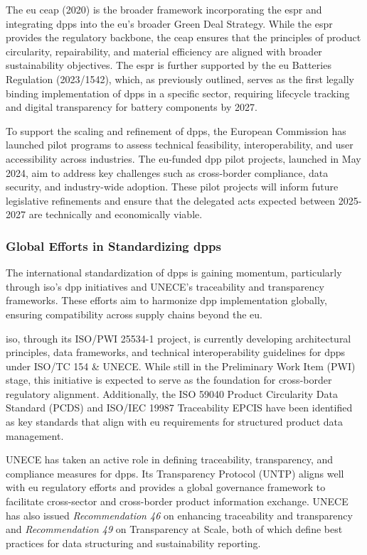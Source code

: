 The \ac{eu} \acrlong{ceap} (2020) is the broader framework incorporating the \ac{espr} and integrating \ac{dpp}s into the \ac{eu}’s broader Green Deal Strategy. While the \ac{espr} provides the regulatory backbone, the \ac{ceap} ensures that the principles of product circularity, repairability, and material efficiency are aligned with broader sustainability objectives. The \ac{espr} is further supported by the \ac{eu} Batteries Regulation (2023/1542), which, as previously outlined, serves as the first legally binding implementation of \ac{dpp}s in a specific sector, requiring lifecycle tracking and digital transparency for battery components by 2027. \autocite{EuropeanCommission.2020, EuropeanParliamentandCouncil.2023}

To support the scaling and refinement of \ac{dpp}s, the European Commission has launched pilot programs to assess technical feasibility, interoperability, and user accessibility across industries. The \ac{eu}-funded \ac{dpp} pilot projects, launched in May 2024, aim to address key challenges such as cross-border compliance, data security, and industry-wide adoption. These pilot projects will inform future legislative refinements and ensure that the delegated acts expected between 2025-2027 are technically and economically viable.

\subsubsection*{Global Efforts in Standardizing \ac{dpp}s}
The international standardization of \ac{dpp}s is gaining momentum, particularly through \acrshort{iso}’s \acrlong{dpp} initiatives and UNECE’s traceability and transparency frameworks. These efforts aim to harmonize \ac{dpp} implementation globally, ensuring compatibility across supply chains beyond the \ac{eu}.

\ac{iso}, through its ISO/PWI 25534-1 project, is currently developing architectural principles, data frameworks, and technical interoperability guidelines for \ac{dpp}s under ISO/TC 154 \& UNECE. While still in the Preliminary Work Item (PWI) stage, this initiative is expected to serve as the foundation for cross-border regulatory alignment. Additionally, the ISO 59040 Product Circularity Data Standard (PCDS) and ISO/IEC 19987 Traceability EPCIS have been identified as key standards that align with \ac{eu} requirements for structured product data management. \autocite{Sun.2025, Heemskerk.2025}

UNECE has taken an active role in defining traceability, transparency, and compliance measures for \ac{dpp}s. Its Transparency Protocol (UNTP) aligns well with \ac{eu} regulatory efforts and provides a global governance framework to facilitate cross-sector and cross-border product information exchange. UNECE has also issued \textit{Recommendation 46} on enhancing traceability and transparency and \textit{Recommendation 49} on Transparency at Scale, both of which define best practices for data structuring and sustainability reporting. \autocite{Heemskerk.2025}

